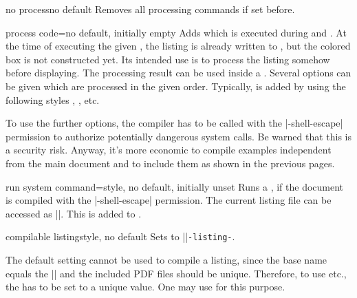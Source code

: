 \clearpage


\begin{docTcbKey}[][doc new=2014-11-14]{no process}{}{no default}
  Removes all processing commands if set before.
\end{docTcbKey}

\begin{docTcbKey}[][doc new=2014-11-14]{process code}{=}{no default, initially empty}
  Adds  which is executed during 
  and . At the time of executing the given ,
  the listing is already written to , but
  the colored box is not constructed yet.
  Its intended use is to process the listing somehow before displaying.
  The processing result can be used inside a .
  Several  options can be given which are
  processed in the given order.
  Typically,  is added by using the following styles
  , , etc.
\end{docTcbKey}

\begin{marker}
To use the further options, the compiler has to be called with the
|-shell-escape| permission to authorize potentially dangerous system calls.
Be warned that this is a security risk. Anyway, it's more economic to
compile examples independent from the main document and to include them as
shown in the previous pages.
\end{marker}

\begin{docTcbKey}[][doc new=2014-11-14]{run system command}{=}{style, no default, initially unset}
Runs a , if the document is compiled with the
|-shell-escape| permission.
The current listing file can be accessed as |\filename@area\filename@base\filename@ext|.
This  is added to .
\end{docTcbKey}


\begin{docTcbKey}[][doc new and updated={2014-11-14}{2016-05-27}]{compilable listing}{}{style, no default}
  Sets  to |\jobname|\texttt{-listing-}.
  \begin{marker}
  The default  setting cannot be used to compile
  a listing, since the base name equals the |\jobname| and the included PDF
  files should be unique.
  Therefore, to use  etc., the 
  has to be set to a unique value.
  One may use  for this purpose.
  \end{marker}
\end{docTcbKey}

